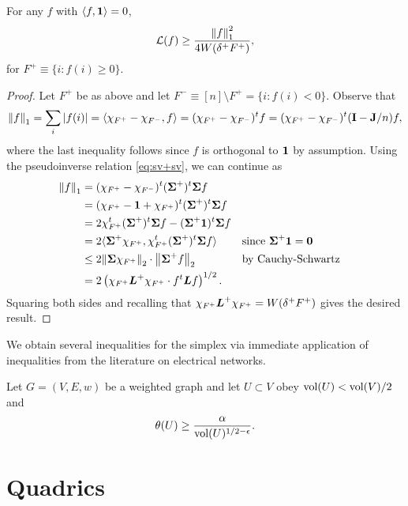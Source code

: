 \begin{lemma}
For any $f$ with $\langle f,\vb{1}\rangle=0$, 
\begin{equation*}
    \mathcal{L}(f) \geq \frac{\norm{f}_1^2}{4W(\delta^+F^+)},
\end{equation*}
for $F^+\equiv \{i:f(i)\geq 0\}$. 
\end{lemma}
\begin{proof}
Let $F^+$ be as above and let $F^-\equiv [n]\setminus F^+=\{i:f(i)<0\}$. Observe that 
\begin{equation*}
    \norm{f}_1=\sum_i |f(i)| = \langle \chi_{F^+}-\chi_{F^-},f\rangle = (\chi_{F^+}-\chi_{F^-})^t f = (\chi_{F^+}-\chi_{F^-})^t(\vb{I}-\vb{J}/n) f,
\end{equation*}
where the last inequality follows since $f$ is orthogonal to $\vb{1}$ by assumption. Using the pseudoinverse relation \eqref{eq:sv+sv}, we can continue as 
\begin{align*}
    \norm{f}_1 &= (\chi_{F^+}-\chi_{F^-})^t(\boldsymbol{\Sigma}^+)^t \boldsymbol{\Sigma} f \\
    &= (\chi_{F^+}-\vb{1} + \chi_{F^+})^t(\boldsymbol{\Sigma}^+)^t \boldsymbol{\Sigma} f \\
    &=2\chi_{F^+}^t (\boldsymbol{\Sigma}^+)^t \boldsymbol{\Sigma} f - (\boldsymbol{\Sigma}^+\vb{1})^t \boldsymbol{\Sigma} f \\
    &= 2\langle \boldsymbol{\Sigma}^+\chi_{F^+}, \chi_{F^+}^t (\boldsymbol{\Sigma}^+)^t \boldsymbol{\Sigma} f \rangle &&\text{since }\boldsymbol{\Sigma}^+\vb{1} =\vb{0}\\
    &\leq 2\norm{\boldsymbol{\Sigma}\chi_{F^+}}_2 \cdot \norm{\boldsymbol{\Sigma}^+ f}_2 &&\text{by Cauchy-Schwartz}\\
    &= 2\left(\chi_{F^+}\vb*{L}^+\chi_{F^+}\cdot f^t \vb*{L} f\right)^{1/2}.
\end{align*}
Squaring both sides and recalling that $\chi_{F^+}\vb*{L}^+\chi_{F^+} = W(\delta^+F^+)$ gives the desired result. 
\end{proof}

We obtain several inequalities for the simplex via immediate application of inequalities from the literature on electrical networks. 


\begin{lemma}
Let $G=(V,E,w)$ be a weighted graph and let $U\subset V$ obey $\textnormal{vol}(U)<\textnormal{vol}(V)/2$ and \[\theta(U) \geq \frac{\alpha}{\textnormal{vol}(U)^{1/2-\epsilon}}.\]
\end{lemma}
\todo {}

\section{Quadrics}

